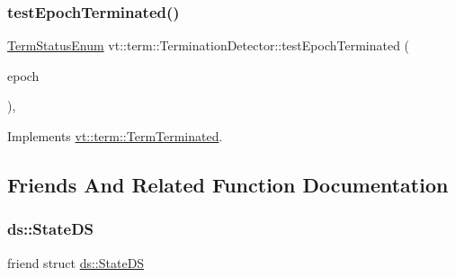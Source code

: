 \mbox{\label{structvt_1_1term_1_1_termination_detector_a1d3cebd2600b5a3900dd9954de55cf35}} 
\subsubsection{\texorpdfstring{test\+Epoch\+Terminated()}{testEpochTerminated()}}
{\footnotesize\ttfamily \hyperlink{namespacevt_1_1term_ad8ec9b371608fc88e7fdeef219785b27}{Term\+Status\+Enum} vt\+::term\+::\+Termination\+Detector\+::test\+Epoch\+Terminated (\begin{DoxyParamCaption}\item[{\hyperlink{namespacevt_a985a5adf291c34a3ca263b3378388236}{Epoch\+Type}}]{epoch }\end{DoxyParamCaption})\hspace{0.3cm}{\ttfamily [override]}, {\ttfamily [virtual]}}



Implements \hyperlink{structvt_1_1term_1_1_term_terminated_a9d23b646c13a95738f72f7abfc8774c7}{vt\+::term\+::\+Term\+Terminated}.



\subsection{Friends And Related Function Documentation}
\mbox{\label{structvt_1_1term_1_1_termination_detector_a9c0b991de134b4bc5bebf051bd067b9f}} 
\subsubsection{\texorpdfstring{ds\+::\+State\+DS}{ds::StateDS}}
{\footnotesize\ttfamily friend struct \hyperlink{structvt_1_1term_1_1ds_1_1_state_d_s}{ds\+::\+State\+DS}\hspace{0.3cm}{\ttfamily [friend]}}

